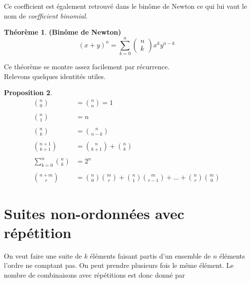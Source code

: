 \documentclass[a4paper,12pt]{report}
\theoremstyle{definition}
\renewcommand{\(}{\left(}
\renewcommand{\)}{\right)}
\renewcommand{\d}{\textit}
\newtheorem{thm}{Théorème}[section]
\newtheorem{prop}[thm]{Proposition}
\begin{document}
        Ce coefficient est également retrouvé dans le binôme de Newton ce qui lui vaut le nom de \d{coefficient binomial}. 
        \begin{leftbar}
        \begin{thm}
            \textbf{(Binôme de Newton)} 
            \begin{equation*}
                (x + y)^n = \sum_{k = 0}^n \begin{pmatrix}n \\k \end{pmatrix} x^k y^{n-k}
            \end{equation*}
        \end{thm}
        \end{leftbar}
        Ce théorème se montre assez facilement par récurrence.\\
        
        Relevons quelques identités utiles.
        
        \begin{leftbar}
        \begin{prop}
            ${}$
            \begin{align*}
                 {n\choose 0} &= {n\choose n} = 1 \\
                 \\
                 {n\choose 1} &= n\\
                 \\
                 {n\choose k} &= {n\choose n-k}\\
                 \\
                 {n+1\choose k+1} &= {n\choose k+1}+{n\choose k}\\
                 \\
                 \sum_{k=0}^n {n\choose k} &= 2^n\\
                 \\
                 {n+m\choose r} &= {n\choose 0}{m\choose r}+{n\choose 1}{m\choose r-1}+\dots + {n\choose r}{m\choose 0}
            \end{align*}
        \end{prop}
        \end{leftbar}
    
    \section{Suites non-ordonnées avec répétition}
    
        On veut faire une suite de $k$ éléments faisant partis d'un ensemble de $n$ éléments l'ordre ne comptant pas. On peut prendre plusieurs fois le même élément. Le nombre de combinaisons avec répétitions est donc donné par
        
\end{document}
